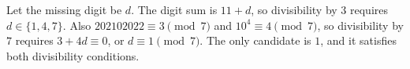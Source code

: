 Let the missing digit be $d$. The digit sum is $11+d$, so divisibility by $3$ requires $d\in\{1,4,7\}$. Also $202102022\equiv3\pmod7$ and $10^4\equiv4\pmod7$, so divisibility by $7$ requires $3+4d\equiv0$, or $d\equiv1\pmod7$. The only candidate is $\boxed1$, and it satisfies both divisibility conditions.
